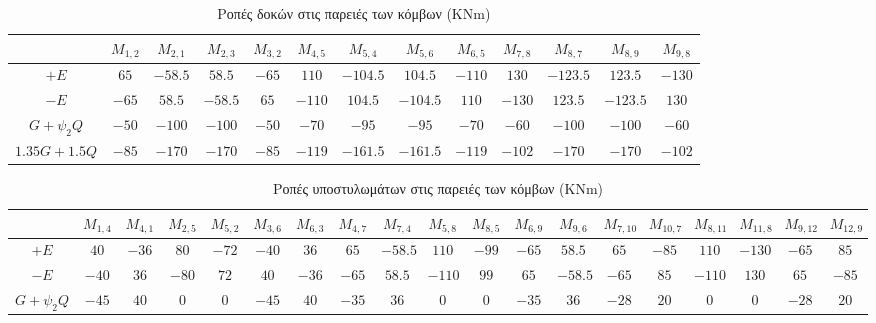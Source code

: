 \begin{landscape}

\begin{table}[h]
\centering\footnotesize
\begin{tabular}{| c || c | c | c | c | c | c | c | c | c | c | c | c |}
\hline
& $M_{1,2}$ & $M_{2,1}$ & $M_{2,3}$ & $M_{3,2}$ & $M_{4,5}$ & $M_{5,4}$ & $M_{5,6}$ & $M_{6,5}$ & $M_{7,8}$ & $M_{8,7}$ & $M_{8,9}$ & $M_{9,8}$ \\
\hline
\hline
$+E$ & $65$ & $-58.5$ & $58.5$ & $-65$ & $110$ & $-104.5$ & $104.5$ & $-110$ & $130$ & $-123.5$ & $123.5$ & $-130$ \\
\hline
$-E$ & $-65$ & $58.5$ & $-58.5$ & $65$ & $-110$ & $104.5$ & $-104.5$ & $110$ & $-130$ & $123.5$ & $-123.5$ & $130$ \\
\hline
$G+\psi_2 Q$ & $-50$ & $-100$ & $-100$ & $-50$ & $-70$ & $-95$ & $-95$ & $-70$ & $-60$ & $-100$ & $-100$ & $-60$ \\
\hline
$1.35G+1.5Q$ & $-85$ & $-170$ & $-170$ & $-85$ & $-119$ & $-161.5$ & $-161.5$ & $-119$ & $-102$ & $-170$ & $-170$ & $-102$ \\
\hline
\end{tabular}
\caption{Ροπές δοκών στις παρειές των κόμβων (\textlatin{KNm})}
\label{tab:momentbeams}
\end{table}

\begin{table}[h]
\centering\footnotesize
\begin{tabular}{| c || c | c | c | c | c | c | c | c | c | c | c | c | c | c | c | c | c | c |}
\hline
& $M_{1,4}$ & $M_{4,1}$ & $M_{2,5}$ & $M_{5,2}$ & $M_{3,6}$ & $M_{6,3}$ & $M_{4,7}$ & $M_{7,4}$ & $M_{5,8}$ & $M_{8,5}$ & $M_{6,9}$ & $M_{9,6}$ & $M_{7,10}$ & $M_{10,7}$ & $M_{8,11}$ & $M_{11,8}$ & $M_{9,12}$ & $M_{12,9}$ \\
\hline
\hline
$+E$ & $40$ & $-36$ & $80$ & $-72$ & $-40$ & $36$ & $65$ & $-58.5$ & $110$ & $-99$ & $-65$ & $58.5$ & $65$ & $-85$ & $110$ & $-130$ & $-65$ & $85$ \\
\hline
$-E$ & $-40$ & $36$ & $-80$ & $72$ & $40$ & $-36$ & $-65$ & $58.5$ & $-110$ & $99$ & $65$ & $-58.5$ & $-65$ & $85$ & $-110$ & $130$ & $65$ & $-85$ \\
\hline
$G+\psi_2 Q$ & $-45$ & $40$ & $0$ & $0$ & $-45$ & $40$ & $-35$ & $36$ & $0$ & $0$ & $-35$ & $36$ & $-28$ & $20$ & $0$ & $0$ & $-28$ & $20$ \\
\hline
\end{tabular}
\caption{Ροπές υποστυλωμάτων στις παρειές των κόμβων (\textlatin{KNm})}
\label{tab:momentcolumns}
\end{table}


\end{landscape}
